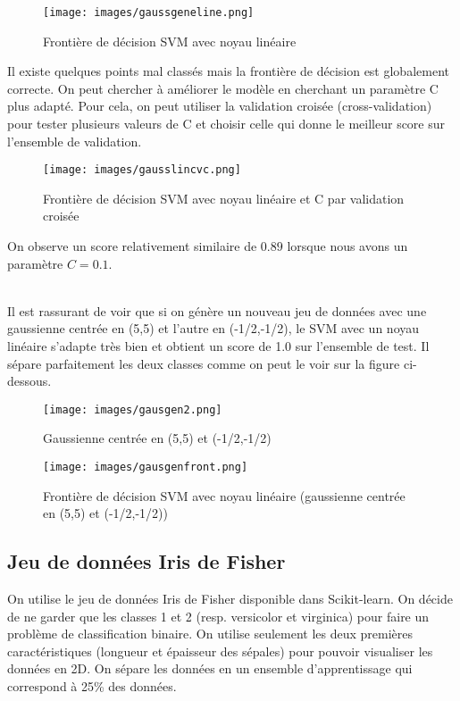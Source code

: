 \documentclass[a4paper, 12pt]{article}
\begin{document}
\begin{figure}[!htbp]
    \centering
    \texttt{[image: images/gaussgeneline.png]}
    \caption{Frontière de décision SVM avec noyau linéaire}
    \label{fig:linear_kernel}
\end{figure}
Il existe quelques points mal classés mais la frontière de décision est globalement correcte. On peut chercher à améliorer le modèle en cherchant un paramètre C plus adapté. Pour cela, on peut utiliser la validation croisée (cross-validation) pour tester plusieurs valeurs de C et choisir celle qui donne le meilleur score sur l'ensemble de validation.
\begin{figure}[h!]
    \centering
    \texttt{[image: images/gausslincvc.png]}
    \caption{Frontière de décision SVM avec noyau linéaire et C par validation croisée}
    \label{fig:linear_kernel_3}
\end{figure}
\par On observe un score relativement similaire de $0.89$ lorsque nous avons un paramètre $C=0.1$.
\\
\\
\par Il est rassurant de voir que si on génère un nouveau jeu de données avec une gaussienne centrée en (5,5) et l'autre en (-1/2,-1/2), le SVM avec un noyau linéaire s'adapte très bien et obtient un score de 1.0 sur l'ensemble de test.
Il sépare parfaitement les deux classes comme on peut le voir sur la figure ci-dessous.

\begin{figure}[!htbp]
    \centering
    \texttt{[image: images/gausgen2.png]}
    \caption{Gaussienne centrée en (5,5) et (-1/2,-1/2)}
    \label{fig:linear_kernel_2}
\end{figure}

\begin{figure}[H]
    \centering
    \texttt{[image: images/gausgenfront.png]}
    \caption{Frontière de décision SVM avec noyau linéaire (gaussienne centrée en (5,5) et (-1/2,-1/2))}
    \label{fig:linear_kernel_3}
\end{figure}

\subsection*{Jeu de données Iris de Fisher}

On utilise le jeu de données Iris de Fisher disponible dans Scikit-learn. On décide de ne garder que les classes 1 et 2 (resp. versicolor et virginica) pour faire un problème de classification binaire.
On utilise seulement les deux premières caractéristiques (longueur et épaisseur des sépales) pour pouvoir visualiser les données en 2D.
On sépare les données en un ensemble d'apprentissage qui correspond à 25\% des données.
\end{document}

